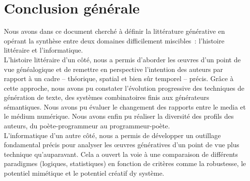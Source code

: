 \documentclass{article}
\begin{document}
	\section{Conclusion générale}
		Nous avons dans ce document cherché à définir la littérature générative en opérant la synthèse entre deux domaines difficilement miscibles~: l'histoire littéraire et l'informatique.\\
		L'histoire littéraire d'un côté, nous a permis d'aborder les œuvres d'un point de vue généalogique et de remettre en perspective l'intention des auteurs par rapport à un cadre -- théorique, spatial et bien sûr temporel -- précis. Grâce à cette approche, nous avons pu constater l'évolution progressive des techniques de génération de texte, des systèmes combinatoires finis aux générateurs sémantiques. Nous avons pu évaluer le changement des rapports entre le media et le médium numérique. Nous avons enfin pu réaliser la diversité des profils des auteurs, du poète-programmeur au programmeur-poète.\\
		L'informatique d'un autre côté, nous a permis de développer un outillage fondamental précis pour analyser les œuvres génératives d'un point de vue plus technique qu'auparavant. Cela a ouvert la voie à une comparaison de différents paradigmes (logiques, statistiques) en fonction de critères comme la robustesse, le potentiel mimétique et le potentiel créatif dy système.\\
		
\end{document}
